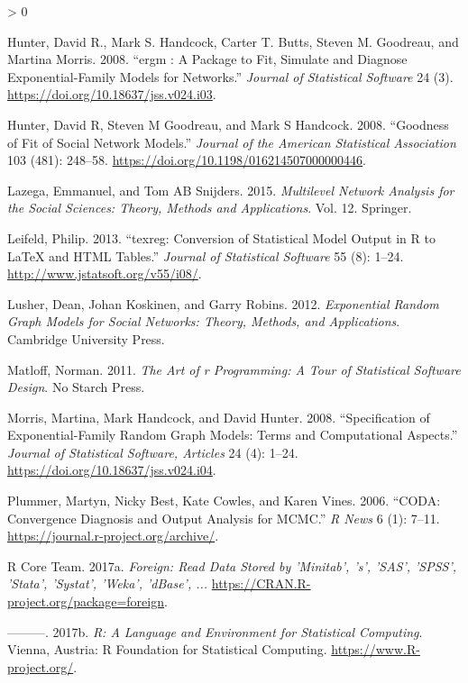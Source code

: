 \documentclass[
]{book}
\newlength{\cslhangindent}
\newenvironment{CSLReferences}[2] %
 {%
  \setlength{\parindent}{0pt}
  \ifodd #1 \everypar{\setlength{\hangindent}{\cslhangindent}}\ignorespaces\fi
  \ifnum #2 > 0
  \setlength{\parskip}{#2\baselineskip}
  \fi
 }%
 {}
\begin{document}
\begin{CSLReferences}{1}{0}
\leavevmode\hypertarget{ref-Hunter2008}{}%
Hunter, David R., Mark S. Handcock, Carter T. Butts, Steven M. Goodreau, and Martina Morris. 2008. {``{ergm : A Package to Fit, Simulate and Diagnose Exponential-Family Models for Networks}.''} \emph{Journal of Statistical Software} 24 (3). \url{https://doi.org/10.18637/jss.v024.i03}.

\leavevmode\hypertarget{ref-HunterJASA2008}{}%
Hunter, David R, Steven M Goodreau, and Mark S Handcock. 2008. {``Goodness of Fit of Social Network Models.''} \emph{Journal of the American Statistical Association} 103 (481): 248--58. \url{https://doi.org/10.1198/016214507000000446}.

\leavevmode\hypertarget{ref-lazega2015}{}%
Lazega, Emmanuel, and Tom AB Snijders. 2015. \emph{Multilevel Network Analysis for the Social Sciences: Theory, Methods and Applications}. Vol. 12. Springer.

\leavevmode\hypertarget{ref-R-texreg}{}%
Leifeld, Philip. 2013. {``{texreg}: Conversion of Statistical Model Output in {R} to {LaTeX} and {HTML} Tables.''} \emph{Journal of Statistical Software} 55 (8): 1--24. \url{http://www.jstatsoft.org/v55/i08/}.

\leavevmode\hypertarget{ref-lusher2012}{}%
Lusher, Dean, Johan Koskinen, and Garry Robins. 2012. \emph{Exponential Random Graph Models for Social Networks: Theory, Methods, and Applications}. Cambridge University Press.

\leavevmode\hypertarget{ref-Matloff2011}{}%
Matloff, Norman. 2011. \emph{The Art of r Programming: A Tour of Statistical Software Design}. No Starch Press.

\leavevmode\hypertarget{ref-Morris2008}{}%
Morris, Martina, Mark Handcock, and David Hunter. 2008. {``Specification of Exponential-Family Random Graph Models: Terms and Computational Aspects.''} \emph{Journal of Statistical Software, Articles} 24 (4): 1--24. \url{https://doi.org/10.18637/jss.v024.i04}.

\leavevmode\hypertarget{ref-R-coda}{}%
Plummer, Martyn, Nicky Best, Kate Cowles, and Karen Vines. 2006. {``{CODA}: Convergence Diagnosis and Output Analysis for MCMC.''} \emph{R News} 6 (1): 7--11. \url{https://journal.r-project.org/archive/}.

\leavevmode\hypertarget{ref-R-foreign}{}%
R Core Team. 2017a. \emph{Foreign: Read Data Stored by 'Minitab', 's', 'SAS', 'SPSS', 'Stata', 'Systat', 'Weka', 'dBase', ...} \url{https://CRAN.R-project.org/package=foreign}.

\leavevmode\hypertarget{ref-R}{}%
---------. 2017b. \emph{R: A Language and Environment for Statistical Computing}. Vienna, Austria: R Foundation for Statistical Computing. \url{https://www.R-project.org/}.


\end{CSLReferences}
\end{document}
